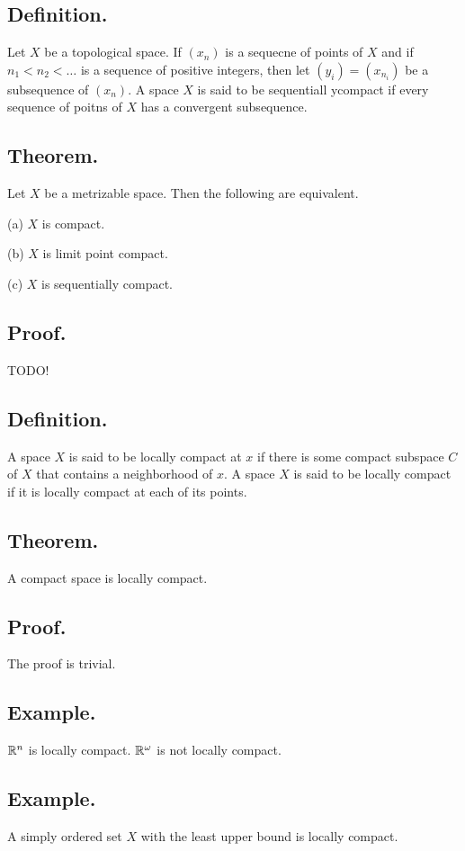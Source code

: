 \documentclass[titlepage]{article}
\begin{document}
\subsection{Definition.} Let $X$ be a topological space. If $(x_{n})$ is a sequecne of points of $X$ and if $n_{1} < n_{2} < \ldots$ is a sequence of positive integers, then let $(y_{i}) = (x_{n_{i}})$ be a subsequence of $(x_{n})$. A space $X$ is said to be sequentiall ycompact if every sequence of poitns of $X$ has a convergent subsequence.

\subsection{Theorem.} Let $X$ be a metrizable space. Then the following are equivalent.

(a) $X$ is compact.

(b) $X$ is limit point compact.

(c) $X$ is sequentially compact.

\subsection{Proof.} TODO!

\subsection{Definition.} A space $X$ is said to be locally compact at $x$ if there is some compact subspace $C$ of $X$ that contains a neighborhood of $x$. A space $X$ is said to be locally compact if it is locally compact at each of its points.

\subsection{Theorem.} A compact space is locally compact.

\subsection{Proof.} The proof is trivial.

\subsection{Example.} $\mathbb{R}^{n}$ is locally compact. $\mathbb{R}^{\omega}$ is not locally compact.

\subsection{Example.} A simply ordered set $X$ with the least upper bound is locally compact.
\end{document}
